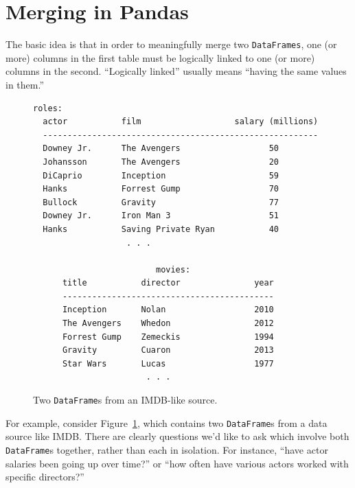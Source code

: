 \section{Merging in Pandas}

The basic idea is that in order to meaningfully merge two \texttt{DataFrames},
one (or more) columns in the first table must be logically linked to one (or
more) columns in the second. ``Logically linked'' usually means ``having the
same values in them.'' 

\label{originalDFs}
\begin{figure}[ht]
\centering
\begin{Verbatim}[fontsize=\small,samepage=true,frame=none]
                          roles:
  actor           film                   salary (millions)
  --------------------------------------------------------
  Downey Jr.      The Avengers                  50
  Johansson       The Avengers                  20
  DiCaprio        Inception                     59
  Hanks           Forrest Gump                  70
  Bullock         Gravity                       77
  Downey Jr.      Iron Man 3                    51
  Hanks           Saving Private Ryan           40
                   . . .
  
                         movies:
      title           director               year
      -------------------------------------------
      Inception       Nolan                  2010
      The Avengers    Whedon                 2012
      Forrest Gump    Zemeckis               1994
      Gravity         Cuaron                 2013
      Star Wars       Lucas                  1977
                       . . .
\end{Verbatim}
\caption{Two \texttt{DataFrame}s from an IMDB-like source.}
\label{fig:imdb}
\end{figure}
 

For example, consider Figure~\ref{fig:imdb}, which contains two
\texttt{DataFrame}s from a data source like IMDB. There are clearly questions
we'd like to ask which involve both \texttt{DataFrame}s together, rather than
each in isolation. For instance, ``have actor salaries been going up over
time?'' or ``how often have various actors worked with specific directors?''

